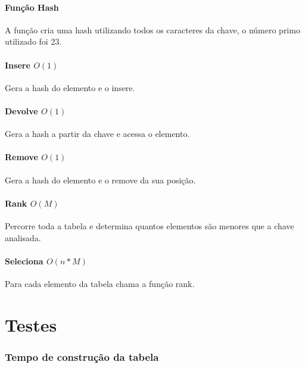 \documentclass[14pt]{article}
\begin{document}
{\subsection{Função Hash}
A função cria uma hash utilizando todos os caracteres da chave, o número primo utilizado foi 23.
\subsection{Insere $O(1)$} 
Gera a hash do elemento e o insere.
\subsection{Devolve $O(1)$} 
Gera a hash a partir da chave e acessa o elemento.
\subsection{Remove $O(1)$}
Gera a hash do elemento e o remove da sua posição.
\subsection{Rank $O(M)$}
Percorre toda a tabela e determina quantos elementos são menores que a chave analisada.
\subsection{Seleciona $O(n*M)$}
Para cada elemento da tabela chama a função rank.

\newpage

\part{Testes}
\section{Tempo de construção da tabela}
}
\end{document}
